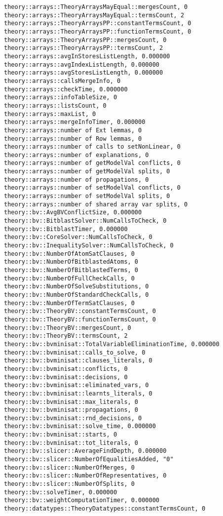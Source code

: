 \begin{lstlisting}
theory::arrays::TheoryArraysMayEqual::mergesCount, 0
theory::arrays::TheoryArraysMayEqual::termsCount, 2
theory::arrays::TheoryArraysPP::constantTermsCount, 0
theory::arrays::TheoryArraysPP::functionTermsCount, 0
theory::arrays::TheoryArraysPP::mergesCount, 0
theory::arrays::TheoryArraysPP::termsCount, 2
theory::arrays::avgInStoresListLength, 0.000000
theory::arrays::avgIndexListLength, 0.000000
theory::arrays::avgStoresListLength, 0.000000
theory::arrays::callsMergeInfo, 0
theory::arrays::checkTime, 0.000000
theory::arrays::infoTableSize, 0
theory::arrays::listsCount, 0
theory::arrays::maxList, 0
theory::arrays::mergeInfoTimer, 0.000000
theory::arrays::number of Ext lemmas, 0
theory::arrays::number of Row lemmas, 0
theory::arrays::number of calls to setNonLinear, 0
theory::arrays::number of explanations, 0
theory::arrays::number of getModelVal conflicts, 0
theory::arrays::number of getModelVal splits, 0
theory::arrays::number of propagations, 0
theory::arrays::number of setModelVal conflicts, 0
theory::arrays::number of setModelVal splits, 0
theory::arrays::number of shared array var splits, 0
theory::bv::AvgBVConflictSize, 0.000000
theory::bv::BitblastSolver::NumCallsToCheck, 0
theory::bv::BitblastTimer, 0.000000
theory::bv::CoreSolver::NumCallsToCheck, 0
theory::bv::InequalitySolver::NumCallsToCheck, 0
theory::bv::NumberOfAtomSatClauses, 0
theory::bv::NumberOfBitblastedAtoms, 0
theory::bv::NumberOfBitblastedTerms, 0
theory::bv::NumberOfFullCheckCalls, 0
theory::bv::NumberOfSolveSubstitutions, 0
theory::bv::NumberOfStandardCheckCalls, 0
theory::bv::NumberOfTermSatClauses, 0
theory::bv::TheoryBV::constantTermsCount, 0
theory::bv::TheoryBV::functionTermsCount, 0
theory::bv::TheoryBV::mergesCount, 0
theory::bv::TheoryBV::termsCount, 2
theory::bv::bvminisat::TotalVariableEliminationTime, 0.000000
theory::bv::bvminisat::calls_to_solve, 0
theory::bv::bvminisat::clauses_literals, 0
theory::bv::bvminisat::conflicts, 0
theory::bv::bvminisat::decisions, 0
theory::bv::bvminisat::eliminated_vars, 0
theory::bv::bvminisat::learnts_literals, 0
theory::bv::bvminisat::max_literals, 0
theory::bv::bvminisat::propagations, 0
theory::bv::bvminisat::rnd_decisions, 0
theory::bv::bvminisat::solve_time, 0.000000
theory::bv::bvminisat::starts, 0
theory::bv::bvminisat::tot_literals, 0
theory::bv::slicer::AverageFindDepth, 0.000000
theory::bv::slicer::NumberOfEqualitiesAdded, "0"
theory::bv::slicer::NumberOfMerges, 0
theory::bv::slicer::NumberOfRepresentatives, 0
theory::bv::slicer::NumberOfSplits, 0
theory::bv::solveTimer, 0.000000
theory::bv::weightComputationTimer, 0.000000
theory::datatypes::TheoryDatatypes::constantTermsCount, 0

\end{lstlisting}
